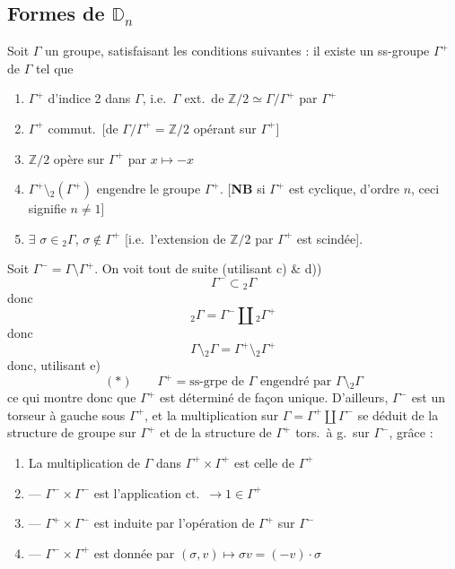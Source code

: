 \documentclass[11pt,a4paper]{article}
\begin{document}
\subsection*{Formes de $\mathbb{D}_n$}

Soit $\Gamma$ un groupe,  satisfaisant les conditions
suivantes : il existe un ss-groupe $\Gamma^{+}$ de $\Gamma$ tel que
\begin{enumerate}
  \item[a)] $\Gamma^{+}$ d'indice 2 dans $\Gamma$, i.e.\ $\Gamma$ ext.\ de
  $\mathbb{Z}/2 \simeq \Gamma/\Gamma^{+}$ par $\Gamma^{+}$
  \item[b)] $\Gamma^{+}$ \struck{\ill{}} commut.\ [de
  $\Gamma/\Gamma^{+} = \mathbb{Z}/2$ opérant sur $\Gamma^{+}$]
  \item[c)] $\mathbb{Z}/2$ opère sur $\Gamma^{+}$ par $x \mapsto -x$
  \item[e)] $\Gamma^{+} \setminus {}_2(\Gamma^{+})$ engendre le groupe
  $\Gamma^{+}$. [\textbf{NB} si $\Gamma^{+}$ est cyclique, 
  d'ordre $n$, ceci signifie $n \neq 1$]
  \item[d)] $\exists$ $\sigma \in {}_2\Gamma$, $\sigma \notin \Gamma^{+}$
  [i.e.\ l'extension de $\mathbb{Z}/2$ par $\Gamma^{+}$ est scindée].
\end{enumerate}


 Soit  $\Gamma^{-} = \Gamma \setminus
\Gamma^{+}$. On voit tout de suite  (utilisant c) \& d))
\[
  \Gamma^{-} \subset {}_2\Gamma
\]
donc
\[
  {}_2\Gamma = \Gamma^{-} \amalg {}_2\Gamma^{+}
\]
donc
\[
  \Gamma \setminus {}_2\Gamma = \Gamma^{+} \setminus {}_2\Gamma^{+}
\]
donc, utilisant e)
\[
  (*) \qquad \Gamma^{+} = \text{ss-grpe de } \Gamma \text{ engendré par } \Gamma \setminus {}_2\Gamma
\]
ce qui montre donc que $\Gamma^{+}$ est déterminé de façon unique.
D'ailleurs, $\Gamma^{-}$ est un torseur à gauche sous $\Gamma^{+}$, et la
multiplication sur $\Gamma = \Gamma^{+} \amalg \Gamma^{-}$ se déduit de la
structure de groupe sur $\Gamma^{+}$ et de la structure de
$\Gamma^{+}$ tors.\ à g.\ sur $\Gamma^{-}$, grâce :
\begin{enumerate}
  \item[1°)] La multiplication de $\Gamma$ dans
  $\Gamma^{+} \times \Gamma^{+}$ est celle de $\Gamma^{+}$
  \item[2°)] --- \quad $\Gamma^{-} \times \Gamma^{-}$ est l'application
  ct.\ $\to 1 \in \Gamma^{+}$
  \item[3°)] --- \quad $\Gamma^{+} \times \Gamma^{-}$ est induite par
  l'opération de $\Gamma^{+}$ sur $\Gamma^{-}$
  \item[4°)] --- \quad $\Gamma^{-} \times \Gamma^{+}$ est donnée par
  $(\sigma, v) \mapsto \sigma v = (-v) \cdot \sigma$
\end{enumerate}
\end{document}
